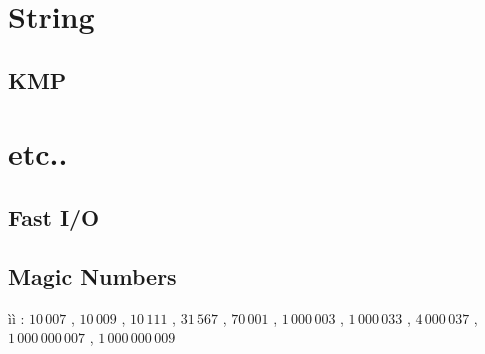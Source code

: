 \documentclass[10pt,landscape,a4paper,twocolumn]{article}
\begin{document}
\section{String}

\subsection{KMP}


%

%


%


\section{etc..}

\subsection{Fast I/O}


\subsection{Magic Numbers}

ìì : $10\,007$ , $10\,009$ , $10\,111$ , $31\,567$ , $70\,001$ , $1\,000\,003$ , $1\,000\,033$ , $4\,000\,037$ , $1\,000\,000\,007$ , $1\,000\,000\,009$

%
\end{document}

